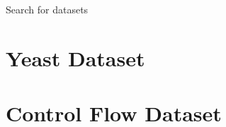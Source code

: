 \appendix
\appendixpage

Search for datasets

\section{Yeast Dataset}

\section{Control Flow Dataset}
